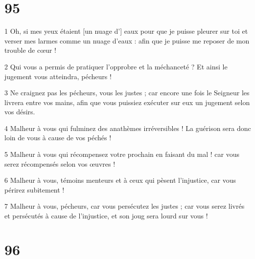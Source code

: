 \chapter{95}

\par 1 Oh, si mes yeux étaient [un nuage d'] eaux pour que je puisse pleurer sur toi et verser mes larmes comme un nuage d'eaux : afin que je puisse me reposer de mon trouble de cœur !
\par 2 Qui vous a permis de pratiquer l'opprobre et la méchanceté ? Et ainsi le jugement vous atteindra, pécheurs !
\par 3 Ne craignez pas les pécheurs, vous les justes ; car encore une fois le Seigneur les livrera entre vos mains, afin que vous puissiez exécuter sur eux un jugement selon vos désirs.
\par 4 Malheur à vous qui fulminez des anathèmes irréversibles ! La guérison sera donc loin de vous à cause de vos péchés !
\par 5 Malheur à vous qui récompensez votre prochain en faisant du mal ! car vous serez récompensés selon vos œuvres !
\par 6 Malheur à vous, témoins menteurs et à ceux qui pèsent l'injustice, car vous périrez subitement !
\par 7 Malheur à vous, pécheurs, car vous persécutez les justes ; car vous serez livrés et persécutés à cause de l'injustice, et son joug sera lourd sur vous !

\chapter{96}

